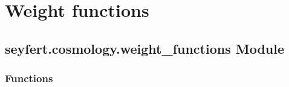 \documentclass[letterpaper,10pt,english]{sphinxmanual}
\begin{document}
\section{Weight functions}
\label{\detokenize{weight_functions:weight-functions}}\label{\detokenize{weight_functions::doc}}

\subsection{seyfert.cosmology.weight\_functions Module}
\label{\detokenize{weight_functions:module-seyfert.cosmology.weight_functions}}\label{\detokenize{weight_functions:seyfert-cosmology-weight-functions-module}}

\subsubsection{Functions}
\label{\detokenize{weight_functions:functions}}
\end{document}
